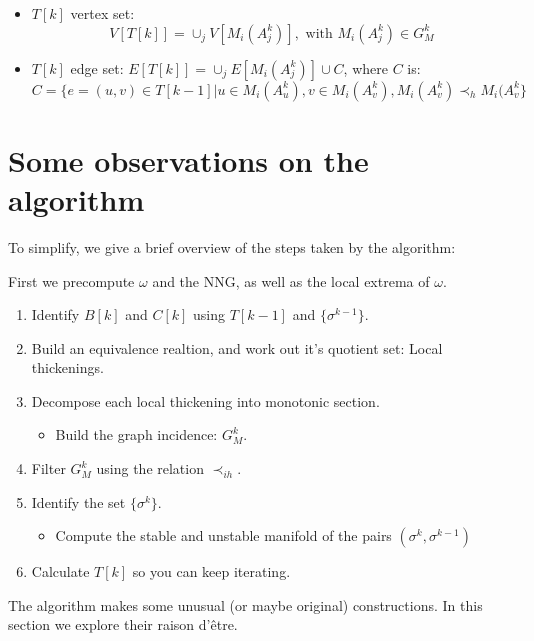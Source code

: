 \begin{itemize}
        \begin{itemize}
            \item $T[k]$ vertex set:
                $$
                V[T[k]]=
                \cup_j V[M_i(A_j^k)], \text{ with } M_i(A_j^k)\in G_M^k
                $$
            \item $T[k]$ edge set:
                $E[T[k]]=\cup_j E[M_i(A_j^k)]\cup C$, where $C$ is:
                $$
                C=\{
                    e=(u,v)\in T[k-1]\vert
                    u\in M_i(A_u^k),
                    v\in M_i(A_v^k),
                     M_i(A_v^k) \prec_h M_i(A_v^k
                \}
                $$
        \end{itemize}

\end{itemize}

\section{Some observations on the algorithm}

To simplify, we give a brief overview of the steps taken by the algorithm:

First we precompute $\omega$ and the NNG, as well
as the local extrema of $\omega$.
\begin{enumerate}
    \item Identify $B[k]$ and $C[k]$ using $T[k-1]$ and $\{\sigma^{k-1}\}$.
    \item Build an equivalence realtion, and work out it's quotient set: Local thickenings.
    \item Decompose each local thickening into monotonic section.
    \begin{itemize}
        \item Build the graph incidence: $G_M^k$.
    \end{itemize}
    \item Filter $G_M^k$ using the relation $\prec_{ih}$.
    \item Identify the set $\{\sigma^k\}$.
    \begin{itemize}
        \item Compute the stable and unstable manifold of the pairs $(\sigma^k,\sigma^{k-1})$  
    \end{itemize}
    \item Calculate $T[k]$ so you can keep iterating.
\end{enumerate}

The algorithm makes some unusual (or maybe original) constructions. In this
section we explore their raison d'\^etre.


